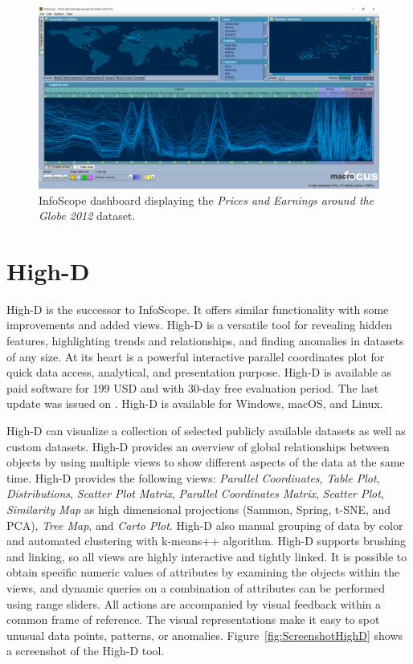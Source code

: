 \begin{figure}[tp]
\centering
\includegraphics[keepaspectratio,width=\linewidth,height=\halfh]
{images/screenshot-infoscope.png}

\caption[InfoScope Dashboard Screenshot]
{%
InfoScope dashboard displaying the \emph{Prices and Earnings around the Globe 2012} dataset.
}
\label{fig:ScreenshotInfoScope}
\end{figure}




\section{High-D}

High-D \parencite{HighD} is the successor to InfoScope. It offers similar
functionality with some improvements and added views. High-D is a
versatile tool for revealing hidden features, highlighting trends and
relationships, and finding anomalies in datasets of any size. At its heart
is a powerful interactive parallel coordinates plot for quick data access,
analytical, and presentation purpose. High-D is available as paid software
for 199 USD and with 30-day free evaluation period. The last update was
issued on . High-D is available for Windows,
macOS, and Linux.


High-D can visualize a collection of selected publicly available datasets
as well as custom datasets. High-D provides an overview of global
relationships between objects by using multiple views to show different
aspects of the data at the same time. High-D provides the following views:
\emph{Parallel Coordinates}, \emph{Table Plot}, \emph{Distributions},
\emph{Scatter Plot Matrix}, \emph{Parallel Coordinates Matrix},
\emph{Scatter Plot}, \emph{Similarity Map} as high dimensional projections
(Sammon, Spring, t-SNE, and PCA), \emph{Tree Map}, and \emph{Carto Plot}.
High-D also manual grouping of data by color and automated clustering with
k-means++ algorithm. High-D supports brushing and linking, so all views
are highly interactive and tightly linked. It is possible to obtain
specific numeric values of attributes by examining the objects within the
views, and dynamic queries on a combination of attributes can be performed
using range sliders. All actions are accompanied by visual feedback within
a common frame of reference. The visual representations make it easy to
spot unusual data points, patterns, or anomalies.
Figure~\ref{fig:ScreenshotHighD} shows a screenshot of the High-D tool.




